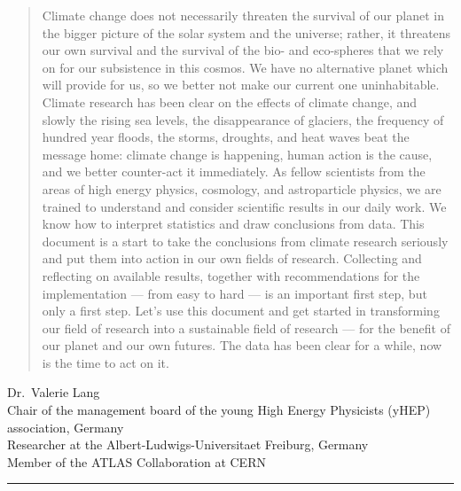 \documentclass[../SustainableHEP.tex]{subfiles}
\begin{document}
\begin{quotation}
Climate change does not necessarily threaten the survival of our planet in the bigger picture of the solar system and the universe; rather, it threatens our own survival and the survival of the bio- and eco-spheres that we rely on for our subsistence in this cosmos. We have no alternative planet which will provide for us, so we better not make our current one uninhabitable.
Climate research has been clear on the effects of climate change, and slowly the rising sea levels, the disappearance of glaciers, the frequency of hundred year floods, the storms, droughts, and heat waves beat the message home: climate change is happening, human action is the cause, and we better counter-act it immediately.
As fellow scientists from the areas of high energy physics, cosmology, and astroparticle physics, we are trained to understand and consider scientific results in our daily work. We know how to interpret statistics and draw conclusions from data. 
This document is a start to take the conclusions from climate research seriously and put them into action in our own fields of research. Collecting and reflecting on available results, together with recommendations for the implementation --- from easy to hard --- is an important first step, but only a first step. Let's use this document and get started in transforming our field of research into a sustainable field of research --- for the benefit of our planet and our own futures. The data has been clear for a while, now is the time to act on it.
\end{quotation}
\begin{flushleft}
Dr.~Valerie Lang \\
Chair of the management board of the young High Energy Physicists (yHEP) association, Germany\\
Researcher at the Albert-Ludwigs-Universitaet Freiburg, Germany\\Member of the ATLAS Collaboration at CERN
\end{flushleft}

\textcolor{Pythongreen}{\rule{2cm}{3pt}}
\end{document}

